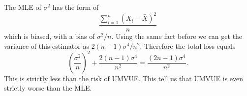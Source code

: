\documentclass[12pt]{article}
\newcommand{\1}{\mathbbm{1}}
\begin{document}
The MLE of $\sigma^2$ has the form of
$$
\frac{\sum_{i=1}^n(X_i -\bar{X})^2 }{n}
$$
which is biased, with a bias of $\sigma^2/n$. Using the same fact before we can get the variance of this estimator as $2(n-1)\sigma^4/n^2$. Therefore the total loss equals
$$
(\frac{\sigma^2}{n})^2 + \frac{2(n-1) \sigma^4}{n^2} = \frac{(2n-1)\sigma^4}{n^2}.
$$
This is strictly less than the risk of UMVUE. This tell us that UMVUE is even strictly worse than the MLE. 
\end{document}
